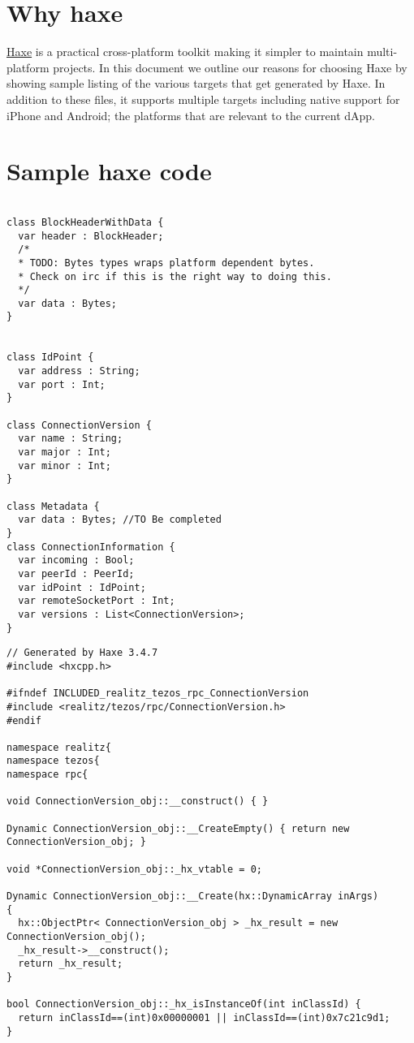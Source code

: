 \documentclass{article}
\begin{document}
\section{Why haxe}
\href{http://haxe.org}{Haxe} is a practical cross-platform toolkit making it simpler to maintain multi-platform projects. In this document we outline our reasons for choosing Haxe by showing sample listing of the various targets that get generated by Haxe. In addition to these files, it supports multiple targets including native support for iPhone and Android; the platforms that are relevant to the current dApp. 
\
\section{Sample haxe code} 
\begin{lstlisting}
  
class BlockHeaderWithData {
  var header : BlockHeader; 
  /* 
  * TODO: Bytes types wraps platform dependent bytes. 
  * Check on irc if this is the right way to doing this.
  */ 
  var data : Bytes;
}


class IdPoint {
  var address : String;
  var port : Int;
}

class ConnectionVersion {
  var name : String;
  var major : Int;
  var minor : Int;
}

class Metadata {
  var data : Bytes; //TO Be completed
}
class ConnectionInformation {
  var incoming : Bool;
  var peerId : PeerId;
  var idPoint : IdPoint;
  var remoteSocketPort : Int;
  var versions : List<ConnectionVersion>;
}
\end{lstlisting}
\begin{lstlisting}
// Generated by Haxe 3.4.7
#include <hxcpp.h>

#ifndef INCLUDED_realitz_tezos_rpc_ConnectionVersion
#include <realitz/tezos/rpc/ConnectionVersion.h>
#endif

namespace realitz{
namespace tezos{
namespace rpc{

void ConnectionVersion_obj::__construct() { }

Dynamic ConnectionVersion_obj::__CreateEmpty() { return new ConnectionVersion_obj; }

void *ConnectionVersion_obj::_hx_vtable = 0;

Dynamic ConnectionVersion_obj::__Create(hx::DynamicArray inArgs)
{
  hx::ObjectPtr< ConnectionVersion_obj > _hx_result = new ConnectionVersion_obj();
  _hx_result->__construct();
  return _hx_result;
}

bool ConnectionVersion_obj::_hx_isInstanceOf(int inClassId) {
  return inClassId==(int)0x00000001 || inClassId==(int)0x7c21c9d1;
}

\end{lstlisting}
\end{document}
